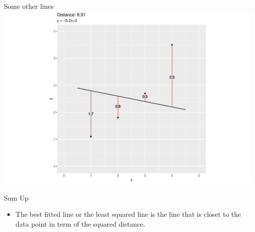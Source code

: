 \documentclass[
  ignorenonframetext,
]{beamer}
\providecommand{\tightlist}{%
  \setlength{\itemsep}{0pt}\setlength{\parskip}{0pt}}\usepackage{longtable,booktabs,array}
\begin{document}
\begin{frame}{Some other lines}
\protect\hypertarget{some-other-lines-3}{}
\includegraphics{1_files/figure-beamer/unnamed-chunk-12-1.pdf}
\end{frame}

\begin{frame}{Sum Up}
\protect\hypertarget{sum-up}{}
\begin{itemize}
\tightlist
\item
  The best fitted line or the least squared line is the line that is
  closet to the data point in term of the squared distance.
\end{itemize}
\end{frame}
\end{document}

